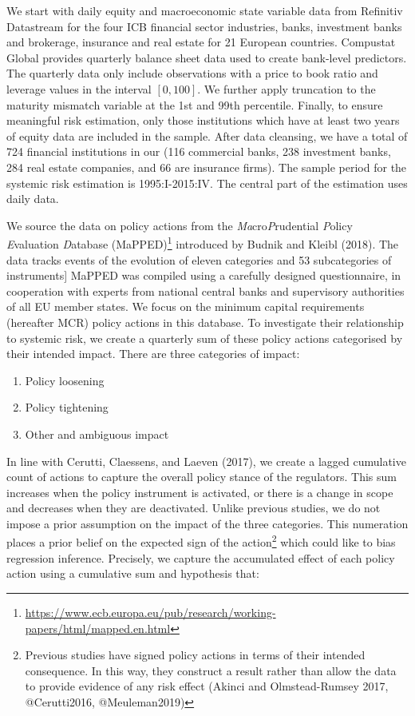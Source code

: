 \documentclass[
  10pt,
]{article}
\providecommand{\tightlist}{%
  \setlength{\itemsep}{0pt}\setlength{\parskip}{0pt}}
\begin{document}
We start with daily equity and macroeconomic state variable data from
Refinitiv Datastream for the four ICB financial sector industries,
banks, investment banks and brokerage, insurance and real estate for 21
European countries. Compustat Global provides quarterly balance sheet
data used to create bank-level predictors. The quarterly data only
include observations with a price to book ratio and leverage values in
the interval \([0,100]\). We further apply truncation to the maturity
mismatch variable at the 1st and 99th percentile. Finally, to ensure
meaningful risk estimation, only those institutions which have at least
two years of equity data are included in the sample. After data
cleansing, we have a total of 724 financial institutions in our (116
commercial banks, 238 investment banks, 284 real estate companies, and
66 are insurance firms). The sample period for the systemic risk
estimation is 1995:I-2015:IV. The central part of the estimation uses
daily data.

We source the data on policy actions from the
\emph{Ma}cro\emph{P}rudential \emph{P}olicy \emph{E}valuation
\emph{D}atabase (MaPPED)\footnote{\url{https://www.ecb.europa.eu/pub/research/working-papers/html/mapped.en.html}}
introduced by Budnik and Kleibl (2018). The data tracks events of the
evolution of eleven categories and 53 subcategories of instruments{]}
MaPPED was compiled using a carefully designed questionnaire, in
cooperation with experts from national central banks and supervisory
authorities of all EU member states. We focus on the minimum capital
requirements (hereafter MCR) policy actions in this database. To
investigate their relationship to systemic risk, we create a quarterly
sum of these policy actions categorised by their intended impact. There
are three categories of impact:

\begin{enumerate}
\def\labelenumi{\arabic{enumi}.}
\tightlist
\item
  Policy loosening
\item
  Policy tightening
\item
  Other and ambiguous impact
\end{enumerate}

In line with Cerutti, Claessens, and Laeven (2017), we create a lagged
cumulative count of actions to capture the overall policy stance of the
regulators. This sum increases when the policy instrument is activated,
or there is a change in scope and decreases when they are deactivated.
Unlike previous studies, we do not impose a prior assumption on the
impact of the three categories. This numeration places a prior belief on
the expected sign of the action\footnote{Previous studies have signed
  policy actions in terms of their intended consequence. In this way,
  they construct a result rather than allow the data to provide evidence
  of any risk effect (Akinci and Olmstead-Rumsey 2017, @Cerutti2016,
  @Meuleman2019)} which could like to bias regression inference.
Precisely, we capture the accumulated effect of each policy action using
a cumulative sum and hypothesis that:
\end{document}
